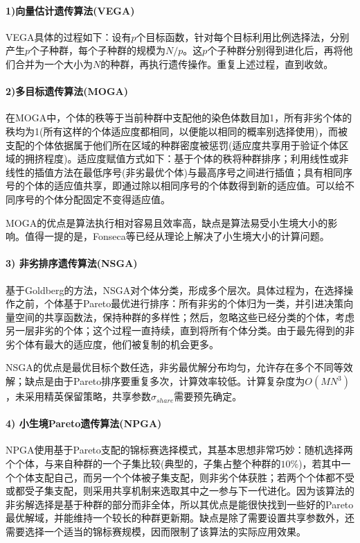             \paragraph{1)向量估计遗传算法(VEGA)}
            VEGA具体的过程如下：设有$p$个目标函数，针对每个目标利用比例选择法，分别产生$p$个子种群，每个子种群的规模为$N/p$。这$p$个子种群分别得到进化后，再将他们合并为一个大小为$N$的种群，再执行遗传操作。重复上述过程，直到收敛。
            \paragraph{2)多目标遗传算法(MOGA)}
            在MOGA中，个体的秩等于当前种群中支配他的染色体数目加1，所有非劣个体的秩均为1(所有这样的个体适应度都相同，以便能以相同的概率别选择使用)，而被支配的个体依据属于他们所在区域的种群密度被惩罚(适应度共享用于验证个体区域的拥挤程度)。适应度赋值方式如下：基于个体的秩将种群排序；利用线性或非线性的插值方法在最低序号(非劣最优个体)与最高序号之间进行插值；具有相同序号的个体的适应值共享，即通过除以相同序号的个体数得到新的适应值。可以给不同序号的个体分配固定不变得适应值。
            \par
            MOGA的优点是算法执行相对容易且效率高，缺点是算法易受小生境大小的影响。值得一提的是，Fonseca等已经从理论上解决了小生境大小的计算问题。
            \paragraph{3) 非劣排序遗传算法(NSGA)}
            基于Goldberg的方法，NSGA对个体分类，形成多个层次。具体过程为，在选择操作之前，个体基于Pareto最优进行排序：所有非劣的个体归为一类，并引进决策向量空间的共享函数法，保持种群的多样性；然后，忽略这些已经分类的个体，考虑另一层非劣的个体；这个过程一直持续，直到将所有个体分类。由于最先得到的非劣个体有最大的适应度，他们被复制的机会更多。
            \par
            NSGA的优点是最优目标个数任选，非劣最优解分布均匀，允许存在多个不同等效解；缺点是由于Pareto排序要重复多次，计算效率较低。计算复杂度为$O(MN^3)$，未采用精英保留策略，共享参数$\sigma_{share}$需要预先确定。
            \paragraph{4) 小生境Pareto遗传算法(NPGA)}
            NPGA使用基于Pareto支配的锦标赛选择模式，其基本思想非常巧妙：随机选择两个个体，与来自种群的一个子集比较(典型的，子集占整个种群的$10\%$)，若其中一个个体支配自己，而另一个个体被子集支配，则非劣个体获胜；若两个个体都不受或都受子集支配，则采用共享机制来选取其中之一参与下一代进化。因为该算法的非劣解选择是基于种群的部分而非全体，所以其优点是能很快找到一些好的Pareto最优解域，并能维持一个较长的种群更新期。缺点是除了需要设置共享参数外，还需要选择一个适当的锦标赛规模，因而限制了该算法的实际应用效果。
